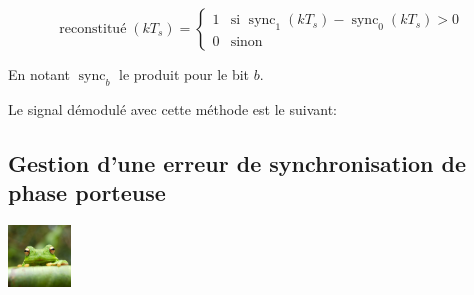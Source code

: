 \documentclass{article}
\begin{document}
$$
\operatorname{reconstitué}(kT_s) = \begin{cases}
    1 & \text{si } \operatorname{sync}_1(kT_s) - \operatorname{sync}_0(kT_s) > 0 \\
    0 & \text{sinon}
\end{cases}
$$

En notant $\operatorname{sync}_b$ le produit pour le bit $b$.

Le signal démodulé avec cette méthode est le suivant:


\begin{figure}

\end{figure}



\subsection{Gestion d'une erreur de synchronisation de phase porteuse}




\begin{center}
    \includegraphics[width=0.125\textwidth]{frog.jpg}
\end{center}
\end{document}
